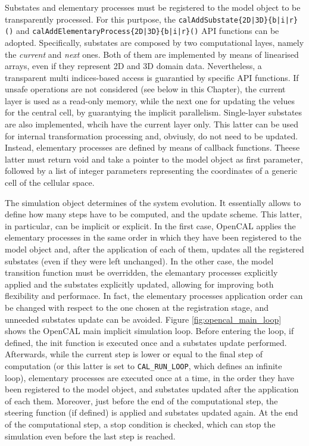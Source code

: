 Substates and elementary processes must be registered to the model
object to be transparently processed. For this purtpose, the
\verb'calAddSubstate{2D|3D}{b|i|r}()' and
\verb'calAddElementaryProcess{2D|3D}{b|i|r}()' API functions can be
adopted. Specifically, substates are composed by two computational
layes, namely the \emph{current} and \emph{next} ones. Both of them
are implemented by means of linearised arrays, even if they represent
2D and 3D domain data. Nevertheless, a transparent multi indices-based
access is guarantied by specific API functions. If unsafe operations
are not considered (see below in this Chapter), the current layer is
used as a read-only memory, while the next one for updating the velues
for the central cell, by guarantying the implicit
parallelism. Single-layer substates are also implemented, whcih have
the current layer only. This latter can be used for internal
transformation processing and, obviusly, do not need to be
updated. Instead, elementary processes are defined by means of
callback functions. Theese latter must return void and take a pointer
to the model object as first parameter, followed by a list of integer
parameters representing the coordinates of a generic cell of the
cellular space.

The simulation object determines of the system evolution. It
essentially allows to define how many steps have to be computed, and
the update scheme. This latter, in particular, can be implicit or
explicit. In the first case, OpenCAL applies the elementary processes
in the same order in which they have been registered to the model
object and, after the application of each of them, updates all the
registered substates (even if they were left unchanged). In the other
case, the model transition function must be overridden, the elemantary
processes explicitly applied and the substates explicitly updated,
allowing for improving both flexibility and performace. In fact, the
elementary processes application order can be changed with respect to
the one chosen at the registration stage, and unneeded substates
update can be avoided. Figure \ref{fig:opencal_main_loop} shows the
OpenCAL main implicit simulation loop. Before entering the loop, if
defined, the init function is executed once and a substates update
performed. Afterwards, while the current step is lower or equal to the
final step of computation (or this latter is set to
\verb'CAL_RUN_LOOP', which defines an infinite loop), elementary
processes are executed once at a time, in the order they have been
registered to the model object, and substates updated after the
application of each them. Moreover, just before the end of the
computational step, the steering function (if defined) is applied and
substates updated again. At the end of the computational step, a stop
condition is checked, which can stop the simulation even before the
last step is reached.


